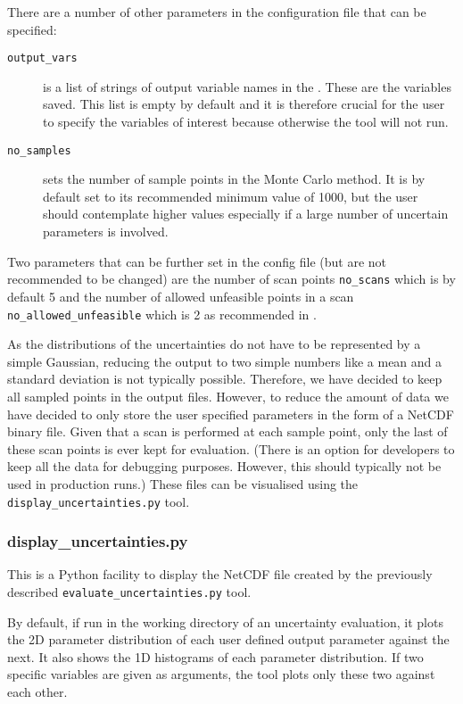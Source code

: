 There are a number of other parameters in the configuration file that can be
specified:
\begin{description}
\item[\texttt{output\_vars}] is a list of strings of output variable names in
  the \mfile. These are the variables saved. This list is empty by default and
  it is therefore crucial for the user to specify the variables of interest
  because otherwise the tool will not run.
\item[\texttt{no\_samples}] sets the number of sample points in the Monte
  Carlo method. It is by default set to its recommended minimum value of 1000,
  but the user should contemplate higher values especially if a large number
  of uncertain parameters is involved.
\end{description}
Two parameters that can be further set in the config file (but are not
recommended to be changed) are the number of scan points \texttt{no\_scans}
which is by default 5 and the number of allowed unfeasible points in a scan
\texttt{no\_allowed\_unfeasible} which is 2 as recommended in
\cite{WPPMI2014Report}.
 
As the distributions of the uncertainties do not have to be represented by a
simple Gaussian, reducing the output to two simple numbers like a mean and a
standard deviation is not typically possible. Therefore, we have decided to
keep all sampled points in the output files. However, to reduce the amount of
data we have decided to only store the user specified parameters in the form
of a NetCDF binary file. Given that a scan is performed at each sample point,
only the last of these scan points is ever kept for evaluation. (There is an
option for developers to keep all the data for debugging purposes. However,
this should typically not be used in production runs.) These files can be
visualised using the \texttt{display\_uncertainties.py} tool.


\subsubsection{display\_uncertainties.py}
This is a Python facility to display the NetCDF file created by the previously
described \texttt{evaluate\_uncertainties.py} tool.

By default, if run in the working directory of an uncertainty evaluation, it
plots the 2D parameter distribution of each user defined output parameter
against the next. It also shows the 1D histograms of each parameter
distribution. If two specific variables are given as arguments, the tool plots
only these two against each other.

